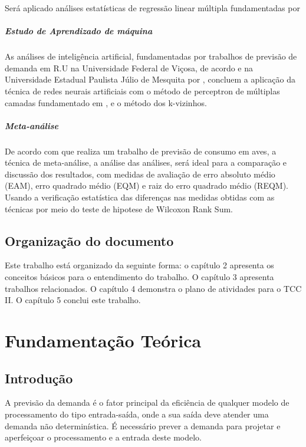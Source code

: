 \documentclass[	12pt, Times, openright, twoside, a4paper, english, brazil]{abntex2}
\begin{document}
Será aplicado análises estatísticas de regressão linear múltipla fundamentadas por \cite{Clarice2011}

\paragraph*{Estudo de Aprendizado de máquina}
As análises de inteligência artificial, fundamentadas por trabalhos de previsão de demanda em R.U na Universidade Federal de Viçosa, de acordo \cite{Lopes2008} e na Universidade Estadual Paulista Júlio de Mesquita por \cite{Rocha2011}, concluem a aplicação da técnica de redes neurais artificiais com o método de perceptron de múltiplas camadas fundamentado em \cite{Haykin1994}, e o método dos k-vizinhos.

\paragraph*{Meta-análise}

De acordo com \cite{Flavia2014} que realiza um trabalho de previsão de consumo em aves, a técnica de meta-análise, a análise das análises, será ideal para a comparação e discussão dos resultados, com medidas de avaliação de erro absoluto médio (EAM), erro quadrado médio (EQM) e raiz do erro quadrado médio (REQM). Usando a verificação estatística das diferenças nas medidas obtidas com as técnicas por meio do teste de hipotese de Wilcoxon Rank Sum. 

\section{Organização do documento}
Este trabalho está organizado da seguinte forma: o capítulo 2 apresenta os conceitos básicos para o entendimento do trabalho. O capítulo 3 apresenta trabalhos relacionados. O capítulo 4 demonstra o plano de atividades para o TCC II. O capítulo 5 conclui este trabalho.
\chapter{Fundamentação Teórica}
\section{Introdução}
A previsão da demanda é o fator principal da eficiência de qualquer modelo de processamento do tipo entrada-saída, onde a sua saída deve atender uma demanda não determinística. É necessário prever a demanda para projetar e aperfeiçoar o processamento e a entrada deste modelo. 
\end{document}

